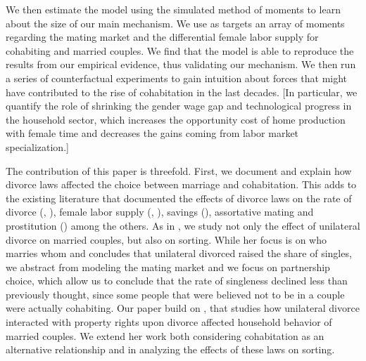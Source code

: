 \documentclass[12pt]{article}
\numberwithin{table}{section}
\begin{document}
We then estimate the model using the simulated method of moments to learn about the size of our main mechanism. We use as targets an array of moments regarding the mating market and the differential female labor supply for cohabiting and married couples. We find that the model is able to reproduce the results from our empirical evidence, thus validating our mechanism. We then run a series of counterfactual experiments to gain intuition about forces that might have contributed to the rise of cohabitation in the last decades. [In particular, we quantify the role of shrinking the gender wage gap and technological progress in the household sector, which increases the opportunity cost of home production with female time and decreases the gains coming from labor market specialization.]

The contribution of this paper is threefold. First, we document and explain how divorce laws affected the choice between marriage and cohabitation. This adds to the existing literature that documented the effects of divorce laws on the rate of divorce (\cite{friedberg1998}, \cite{wolfers2006}), female labor supply (\cite{stevenson2008}, \cite{voena2015}), savings (\cite{voena2015}), assortative mating \cite{reynoso2019} and prostitution (\cite{ciacci2017}) among the others. As in \cite{reynoso2019}, we study not only the effect of unilateral divorce on married couples, but also on sorting. While her focus is on who marries whom and concludes that unilateral divorced raised the share of singles, we abstract from modeling the mating market and we focus on partnership choice, which allow us to conclude that the rate of singleness declined less than previously thought, since some people that were believed not to be in a couple were actually cohabiting. Our paper build on \cite{voena2015}, that studies how unilateral divorce interacted with property rights upon divorce affected household behavior of married couples. We extend her work both considering cohabitation as an alternative relationship and in analyzing the effects of these laws on sorting.
\end{document}
